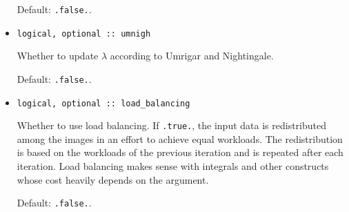 \documentclass{article}
\begin{document}
\begin{itemize}
  Default: \texttt{.false.}.
\item
\begin{verbatim}
logical, optional :: umnigh
\end{verbatim}
  Whether to update $\lambda$ according to Umrigar and Nightingale.

  Default: \texttt{.false.}.
\item
\begin{verbatim}
logical, optional :: load_balancing
\end{verbatim}
  Whether to use load balancing. If \verb+.true.+, the input data is redistributed among the images in an effort to achieve equal workloads. The redistribution is based on the workloads of the previous iteration and is repeated after each iteration. Load balancing makes sense with integrals and other constructs whose cost heavily depends on the argument.

  Default: \verb+.false.+.
\end{itemize}
\end{document}
